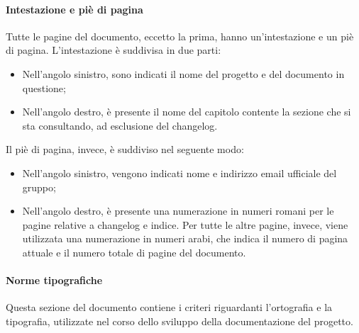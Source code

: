 			\paragraph{Intestazione e piè di pagina}
			Tutte le pagine del documento, eccetto la prima, hanno un'intestazione e un piè di pagina. L’intestazione è suddivisa in due parti:
			\begin{itemize}
				\item Nell’angolo sinistro, sono indicati il nome del progetto e del documento in questione;
				\item Nell’angolo destro, è presente il nome del capitolo contente la sezione che si sta consultando, ad esclusione del changelog.
			\end{itemize}
			Il piè di pagina, invece, è suddiviso nel seguente modo:
			\begin{itemize}
				\item Nell’angolo sinistro, vengono indicati nome e indirizzo email ufficiale del gruppo;
				\item Nell’angolo destro, è presente una numerazione in numeri romani per le pagine relative a changelog e indice. Per tutte le altre pagine, invece, viene utilizzata una numerazione in numeri arabi, che indica il numero di pagina attuale e il numero totale di pagine del documento.
			\end{itemize} 

			\paragraph{Norme tipografiche}
			Questa sezione del documento contiene i criteri riguardanti l’ortografia e la tipografia, utilizzate nel corso dello sviluppo della documentazione del progetto.

